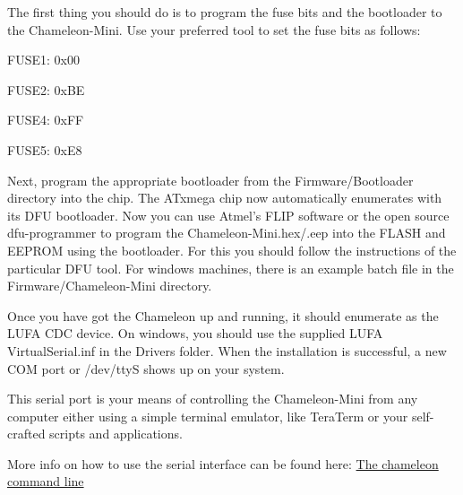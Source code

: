 The first thing you should do is to program the fuse bits and the bootloader to the Chameleon-\/\-Mini. Use your preferred tool to set the fuse bits as follows\-:
\begin{DoxyItemize}
\item F\-U\-S\-E1\-: 0x00
\item F\-U\-S\-E2\-: 0x\-B\-E
\item F\-U\-S\-E4\-: 0x\-F\-F
\item F\-U\-S\-E5\-: 0x\-E8
\end{DoxyItemize}

Next, program the appropriate bootloader from the Firmware/\-Bootloader directory into the chip. The A\-Txmega chip now automatically enumerates with its D\-F\-U bootloader. Now you can use Atmel's F\-L\-I\-P software or the open source dfu-\/programmer to program the Chameleon-\/\-Mini.\-hex/.eep into the F\-L\-A\-S\-H and E\-E\-P\-R\-O\-M using the bootloader. For this you should follow the instructions of the particular D\-F\-U tool. For windows machines, there is an example batch file in the Firmware/\-Chameleon-\/\-Mini directory.

Once you have got the Chameleon up and running, it should enumerate as the L\-U\-F\-A C\-D\-C device. On windows, you should use the supplied L\-U\-F\-A Virtual\-Serial.\-inf in the Drivers folder. When the installation is successful, a new C\-O\-M port or /dev/tty\-S shows up on your system.

This serial port is your means of controlling the Chameleon-\/\-Mini from any computer either using a simple terminal emulator, like Tera\-Term or your self-\/crafted scripts and applications.

More info on how to use the serial interface can be found here\-: \hyperlink{Page_CommandLine}{The chameleon command line} 